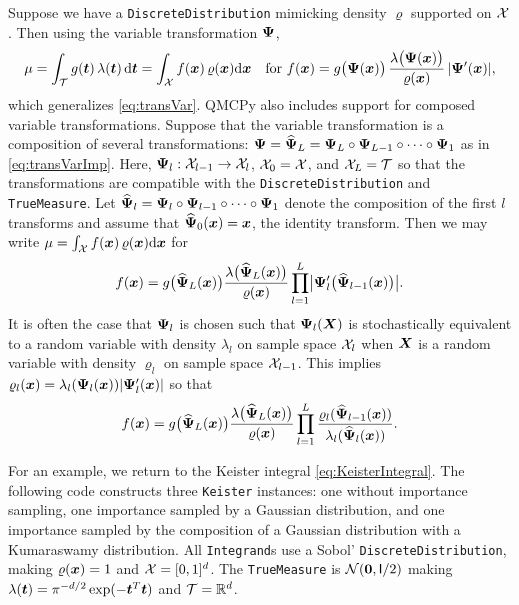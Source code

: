 \documentclass[graybox,footinfo]{svmult}
\newcommand{\mI}{\mathsf{I}}
\begin{document}
Suppose we have a \texttt{DiscreteDistribution} mimicking  density $\varrho$ supported on ${\mathcal{X}}$.  Then using the variable transformation ${\boldsymbol{\Psi}}$, 
\begin{equation*}
	\mu = \int_{\mathcal{T}} g({\boldsymbol{t}}) \, \lambda({\boldsymbol{t}}) \, \mathrm{d} {\boldsymbol{t}}  =  \int_{{\mathcal{X}}}f({\boldsymbol{x}}) \, \varrho({\boldsymbol{x}}) \mathrm{d} {\boldsymbol{x}} \quad \text{for }
   f({\boldsymbol{x}})  = g\bigl({\boldsymbol{\Psi}}({\boldsymbol{x}})\bigr)  \, \frac{\lambda\bigl({\boldsymbol{\Psi}}({\boldsymbol{x}})\bigr)}{\varrho({\boldsymbol{x}})} \, \lvert {\boldsymbol{\Psi}}'({\boldsymbol{x}})\rvert,
\end{equation*}
which generalizes \eqref{eq:transVar}.
QMCPy also includes support for composed variable transformations. Suppose that the variable transformation is a composition of several transformations: ${\boldsymbol{\Psi}}=\widehat{{\boldsymbol{\Psi}}}_L = {\boldsymbol{\Psi}}_L \circ {\boldsymbol{\Psi}}_{L-1} \circ \dots \circ {\boldsymbol{\Psi}}_1$ as in \eqref{eq:transVarImp}. Here, ${\boldsymbol{\Psi}}_l:{\mathcal{X}}_{l-1} \to {\mathcal{X}}_l$,  ${\mathcal{X}}_0={\mathcal{X}}$, and ${\mathcal{X}}_L={\mathcal{T}}$ so that the transformations are compatible with the \texttt{DiscreteDistribution} and \texttt{TrueMeasure}. Let $\widehat{{\boldsymbol{\Psi}}}_l={\boldsymbol{\Psi}}_l \circ {\boldsymbol{\Psi}}_{l-1} \circ \dots \circ {\boldsymbol{\Psi}}_1$ denote the composition of the first $l$ transforms and assume that $\widehat{{\boldsymbol{\Psi}}}_0({\boldsymbol{x}})={\boldsymbol{x}}$, the identity transform. Then we may write $\mu =  \int_{{\mathcal{X}}}f({\boldsymbol{x}}) \, \varrho({\boldsymbol{x}}) \mathrm{d} {\boldsymbol{x}}$ for 
\begin{equation*}
    f({\boldsymbol{x}}) 
 = g\bigl(\widehat{{\boldsymbol{\Psi}}}_L({\boldsymbol{x}})\bigr)\frac{\lambda\bigl(\widehat{{\boldsymbol{\Psi}}}_L({\boldsymbol{x}})\bigr)}{\varrho({\boldsymbol{x}})}\prod_{l=1}^L \bigl\lvert {\boldsymbol{\Psi}}_l'\bigl(\widehat{{\boldsymbol{\Psi}}}_{l-1}({\boldsymbol{x}})\bigr) \bigr\rvert .
\end{equation*}
It is often the case that ${\boldsymbol{\Psi}}_l$ is chosen such that ${\boldsymbol{\Psi}}_l({\boldsymbol{X}})$ is stochastically equivalent to a random variable with density $\lambda_l$ on sample space ${\mathcal{X}}_l$ when ${\boldsymbol{X}}$ is a random variable with density $\varrho_l$ on sample space ${\mathcal{X}}_{l-1}$.  This implies  $\varrho_l({\boldsymbol{x}}) = \lambda_l({\boldsymbol{\Psi}}_l({\boldsymbol{x}}))\lvert  {\boldsymbol{\Psi}}'_l ({\boldsymbol{x}}) \rvert$ so that
\begin{equation*}
f({\boldsymbol{x}}) 
 = g\bigl(\widehat{{\boldsymbol{\Psi}}}_L({\boldsymbol{x}})\bigr)\frac{\lambda\bigl(\widehat{{\boldsymbol{\Psi}}}_L({\boldsymbol{x}})\bigr)}{\varrho({\boldsymbol{x}})}\prod_{l=1}^L \frac{\varrho_l(\widehat{{\boldsymbol{\Psi}}}_{l-1}({\boldsymbol{x}}))}{\lambda_l(\widehat{{\boldsymbol{\Psi}}}_l({\boldsymbol{x}}))} .
\end{equation*}

For an example, we return to the Keister integral \eqref{eq:KeisterIntegral}. The following code constructs three \texttt{Keister} instances: one without importance sampling, one importance sampled by a Gaussian distribution, and one importance sampled by the composition of a Gaussian distribution with a Kumaraswamy distribution. All \texttt{Integrand}s use a Sobol' \texttt{DiscreteDistribution}, making $\varrho({\boldsymbol{x}})=1$ and ${\mathcal{X}} = [0,1]^d$. The \texttt{TrueMeasure} is $\calN(\bszero,\mI/2)$ making $\lambda({\boldsymbol{t}}) = \pi^{-d/2} \exp(-{\boldsymbol{t}}^T {\boldsymbol{t}})$ and ${\mathcal{T}} = {\mathbb{R}}^d$. 
\end{document}

